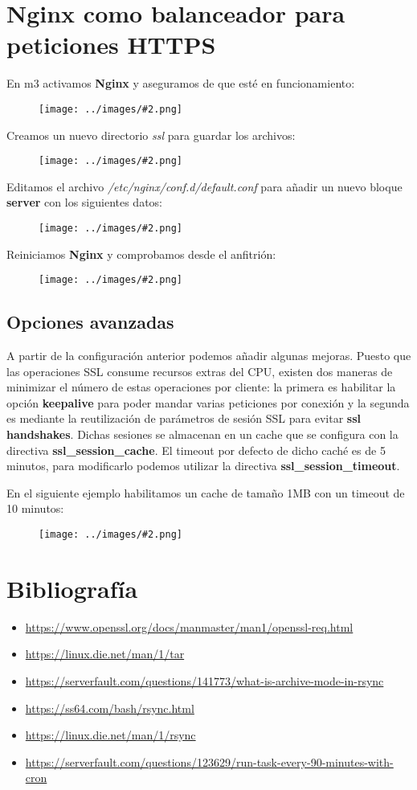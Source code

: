 \documentclass[twoside]{article}
\newcommand{\image}[2]{
\begin{figure}[H]
    \texttt{[image: ../images/\#2.png]}
    \centering
\end{figure}
}
\begin{document}
\section{Nginx como balanceador para peticiones HTTPS}
En m3 activamos \textbf{Nginx} y aseguramos de que esté en funcionamiento:
\image{8}{15}
Creamos un nuevo directorio \textit{ssl} para guardar los archivos:
\image{8}{16}
Editamos el archivo \textit{/etc/nginx/conf.d/default.conf} para añadir un nuevo bloque \textbf{server} con los siguientes datos:
\image{8}{17}
Reiniciamos \textbf{Nginx} y comprobamos desde el anfitrión:
\image{8}{18}

\subsection{Opciones avanzadas}
A partir de la configuración anterior podemos añadir algunas mejoras. Puesto que las operaciones SSL consume recursos extras del CPU, existen dos maneras de minimizar el número de estas operaciones por cliente: la primera es habilitar la opción \textbf{keepalive} para poder mandar varias peticiones por conexión y la segunda es mediante la reutilización de parámetros de sesión SSL para evitar \textbf{ssl handshakes}. Dichas sesiones se almacenan en un cache que se configura con la directiva \textbf{ssl\_session\_cache}. El timeout por defecto de dicho caché es de 5 minutos, para modificarlo podemos utilizar la directiva \textbf{ssl\_session\_timeout}.

En el siguiente ejemplo habilitamos un cache de tamaño 1MB con un timeout de 10 minutos:
\image{8}{19}



\begin{figure}[H]
    \centering
    \begin{subfigure}{.5\textwidth}
        \centering
    \end{subfigure}%
    \begin{subfigure}{.5\textwidth}
        \centering
    \end{subfigure}
\end{figure}


\newpage
\section{Bibliografía}
\begin{itemize}
    \item \url{https://www.openssl.org/docs/manmaster/man1/openssl-req.html}
    

    \item \url{https://linux.die.net/man/1/tar}
    \item \url{https://serverfault.com/questions/141773/what-is-archive-mode-in-rsync}
    \item \url{https://ss64.com/bash/rsync.html}
    \item \url{https://linux.die.net/man/1/rsync}
    \item \url{https://serverfault.com/questions/123629/run-task-every-90-minutes-with-cron}
\end{itemize}
\end{document}
